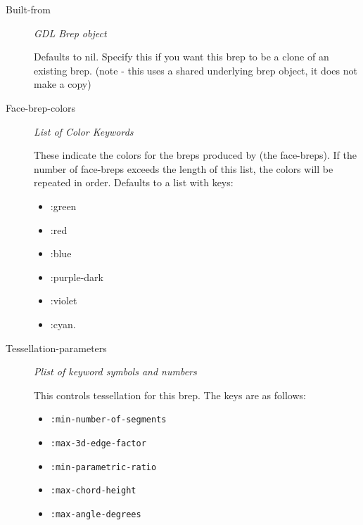\documentclass [11pt]{book}
\begin{document}
\begin{itemize}
\begin{description}
\item [Built-from]
\emph{GDL Brep object}

 Defaults to nil.
Specify this if you want this brep to be a clone of an existing brep. (note -
this uses a shared underlying brep object, it does not make a copy)




\item [Face-brep-colors]
\emph{List of Color Keywords}

 These indicate the colors
for the breps produced by (the face-breps). If the
number of face-breps exceeds the length of this list,
the colors will be repeated in order.
Defaults to a list with keys:


\begin{itemize}

\item  :green 

\item  :red 

\item  :blue 

\item  :purple-dark 

\item  :violet 

\item  :cyan. 

\end{itemize}





\item [Tessellation-parameters]
\emph{Plist of keyword symbols and numbers}

 This controls tessellation for this brep.
The keys are as follows:


\begin{itemize}

\item \texttt{:min-number-of-segments}

\item \texttt{:max-3d-edge-factor}

\item \texttt{:min-parametric-ratio}

\item \texttt{:max-chord-height}

\item \texttt{:max-angle-degrees}


\end{itemize}
\end{description}
\end{itemize}
\end{document}

